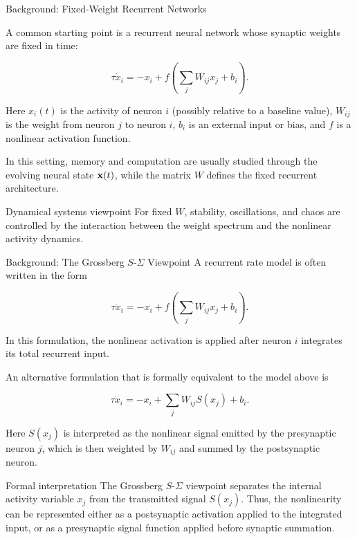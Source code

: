 \documentclass[
11pt,notheorems,hyperref={pdfauthor=whatever}
]{beamer}
\begin{document}
\begin{frame}{Background: Fixed-Weight Recurrent Networks}
\small

A common starting point is a recurrent neural network whose synaptic weights
are fixed in time:

\[
\tau \dot{x}_i
=
-x_i
+
f\left(\sum_j W_{ij}x_j+b_i\right).
\]

Here \(x_i(t)\) is the activity of neuron \(i\) (possibly relative to a baseline value), \(W_{ij}\) is the weight from
neuron \(j\) to neuron \(i\), \(b_i\) is an external input or bias, and \(f\)
is a nonlinear activation function.

\vspace{0.5em}

In this setting, memory and computation are usually studied through the
evolving neural state \({\bf x}(t)\), while the matrix \(W\) defines the fixed
recurrent architecture.

\vspace{0.5em}

\begin{block}{Dynamical systems viewpoint}
For fixed \(W\), stability, oscillations, and chaos are controlled by the
interaction between the weight spectrum and the nonlinear activity dynamics.
\end{block}

\end{frame}

\begin{frame}{Background: The Grossberg \(S\)-\(\Sigma\) Viewpoint}
A recurrent rate model is often written in the form

\[
\tau \dot{x}_i
=
-x_i
+
f\left(\sum_j W_{ij}x_j+b_i\right).
\]

In this formulation, the nonlinear activation is applied after neuron \(i\)
integrates its total recurrent input.

\vspace{0.7em}

An alternative formulation that is formally equivalent to the model above is

\[
\tau \dot{x}_i
=
-x_i
+
\sum_j W_{ij}S(x_j)
+
b_i.
\]

Here \(S(x_j)\) is interpreted as the nonlinear signal emitted by the
presynaptic neuron \(j\), which is then weighted by \(W_{ij}\) and summed by
the postsynaptic neuron.

\vspace{0.7em}

\begin{block}{Formal interpretation}
The Grossberg \(S\)-\(\Sigma\) viewpoint separates the internal activity variable
\(x_j\) from the transmitted signal \(S(x_j)\). Thus, the nonlinearity can be
represented either as a postsynaptic activation applied to the integrated
input, or as a presynaptic signal function applied before synaptic summation.
\end{block}
\end{frame}
\end{document}
